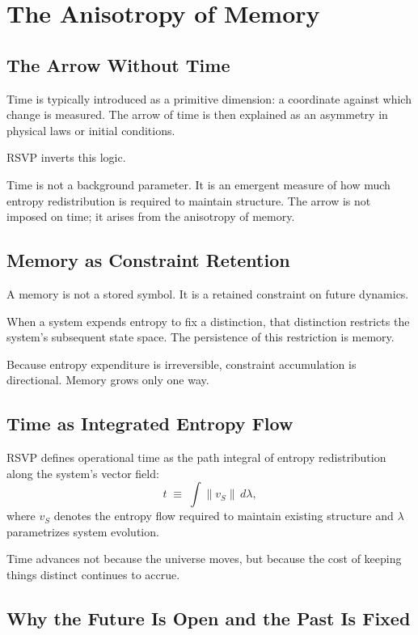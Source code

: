 \documentclass[11pt]{book}
\begin{document}
\chapter{The Anisotropy of Memory}

\section{The Arrow Without Time}

Time is typically introduced as a primitive dimension: a coordinate against which change is measured. The arrow of time is then explained as an asymmetry in physical laws or initial conditions.

RSVP inverts this logic.

Time is not a background parameter. It is an emergent measure of how much entropy redistribution is required to maintain structure. The arrow is not imposed on time; it arises from the anisotropy of memory.

\section{Memory as Constraint Retention}

A memory is not a stored symbol. It is a retained constraint on future dynamics.

When a system expends entropy to fix a distinction, that distinction restricts the system’s subsequent state space. The persistence of this restriction is memory.

Because entropy expenditure is irreversible, constraint accumulation is directional. Memory grows only one way.

\section{Time as Integrated Entropy Flow}

RSVP defines operational time as the path integral of entropy redistribution along the system’s vector field:
\[
t \;\equiv\; \int \lVert v_S \rVert \, d\lambda ,
\]
where \(v_S\) denotes the entropy flow required to maintain existing structure and \(\lambda\) parametrizes system evolution.

Time advances not because the universe moves, but because the cost of keeping things distinct continues to accrue.

\section{Why the Future Is Open and the Past Is Fixed}
\end{document}
